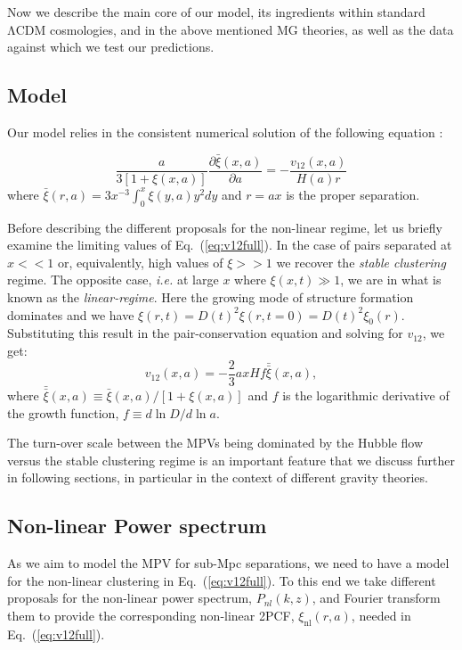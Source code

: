 \documentclass[%
 reprint,
groupedaddress,
nofootinbib,
nobibnotes,
 amsmath,amssymb,
 aps,
]{revtex4-2}
\renewcommand{\emph}[1]{\textit{#1}}
\newcommand{\refeq}[1]{Eq.~(\ref{eq:#1})}
\newcommand{\lcdm}{$\mathrm{\Lambda CDM}$}
\newcommand{\vot}{$v_{12}$}  %
\newcommand{\<}{\langle}
\renewcommand{\>}{\rangle}
\begin{document}
Now we describe the main core of our model, its ingredients within standard \lcdm{} cosmologies, and in the above mentioned MG theories, as well as the data against which we test our predictions.

\subsection{\label{subsec:model}Model}
Our model relies in the consistent numerical solution of the following equation \cite{Juszkiewicz_1999}:

\begin{equation}
    \label{eq:v12full}
    \frac{a}{3[1+\xi(x,a)]}\frac{\partial\bar{\xi}(x,a)}{\partial a} = - \frac{v_{12}(x,a)}{H(a)r}
\end{equation}
%
where $\bar{\xi}(r,a) = 3x^{-3}\int^x_0\xi(y,a)y^2dy$ and  $r=ax$ is the proper separation.

Before describing the different proposals for the non-linear regime, let us briefly examine the limiting values of \refeq{v12full}. In the case of  pairs separated at $x<<1$ or, equivalently, high values of $\xi >>1$ we recover the \emph{stable clustering} regime. 
%
The opposite case, \emph{i.e.} at large $x$ where $\xi(x,t)\gg1$, we are in what is known as the \emph{linear-regime}.  
Here the growing mode of structure formation dominates and we have $\xi(r, t)=D(t)^{2} \xi(r,t=0)=D(t)^{2} \xi_{0}(r)$. Substituting this result in the pair-conservation equation and solving for
\vot{}, we get:
\begin{equation}\label{eq:v12lin}
v_{12}(x,a)=-\frac{2}{3}axHf\bar{\bar{\xi}}(x,a),
\end{equation}
%
where $\bar{\bar{\xi}}(x,a)\equiv \bar{\xi}(x,a)/[1+\xi(x,a)]$ and $f$ is the logarithmic derivative of the growth function, $f\equiv d\ln D/d\ln a$. 

The turn-over scale between the MPVs being dominated by the Hubble flow versus the stable clustering regime is an important feature that we discuss further in following sections, in particular in the context of different gravity theories. 

\subsection{\label{subsec:pk}Non-linear Power spectrum}

As we aim to model the MPV for sub-Mpc separations, we need to have a model for the non-linear clustering in \refeq{v12full}. To this end we take different proposals for the non-linear power spectrum, $P_{nl}(k,z)$, and Fourier transform them to provide the corresponding non-linear 2PCF, $\xi_{\text{nl}}(r,a)$, needed in \refeq{v12full}.  
 
\end{document}
